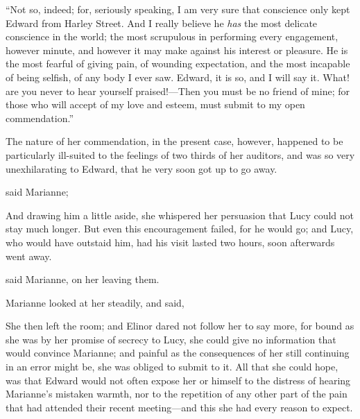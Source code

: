 “Not so, indeed; for, seriously speaking, I am very sure that conscience only kept Edward from Harley Street. And I really believe he {\em has} the most delicate conscience in the world; the most scrupulous in performing every engagement, however minute, and however it may make against his interest or pleasure. He is the most fearful of giving pain, of wounding expectation, and the most incapable of being selfish, of any body I ever saw. Edward, it is so, and I will say it. What! are you never to hear yourself praised!---Then you must be no friend of mine; for those who will accept of my love and esteem, must submit to my open commendation.”

The nature of her commendation, in the present case, however, happened to be particularly ill-suited to the feelings of two thirds of her auditors, and was so very unexhilarating to Edward, that he very soon got up to go away.

 said Marianne; 

And drawing him a little aside, she whispered her persuasion that Lucy could not stay much longer. But even this encouragement failed, for he would go; and Lucy, who would have outstaid him, had his visit lasted two hours, soon afterwards went away.

 said Marianne, on her leaving them. 


Marianne looked at her steadily, and said, 

She then left the room; and Elinor dared not follow her to say more, for bound as she was by her promise of secrecy to Lucy, she could give no information that would convince Marianne; and painful as the consequences of her still continuing in an error might be, she was obliged to submit to it. All that she could hope, was that Edward would not often expose her or himself to the distress of hearing Marianne's mistaken warmth, nor to the repetition of any other part of the pain that had attended their recent meeting---and this she had every reason to expect.

